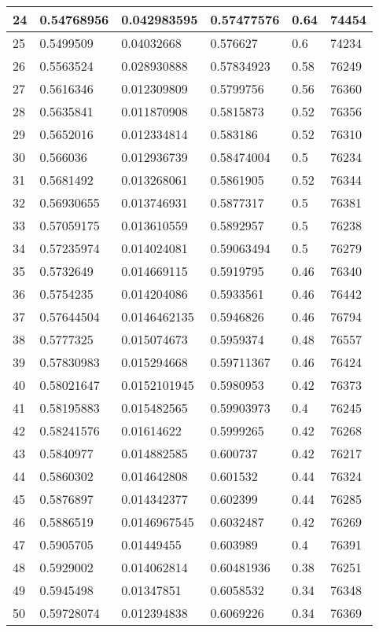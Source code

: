 \begin{longtable}{|l|l|l|l|l|l|}
24 & 0.54768956 & 0.042983595 & 0.57477576 & 0.64 & 74454 \\ \hline 
25 & 0.5499509 & 0.04032668 & 0.576627 & 0.6 & 74234 \\ \hline 
26 & 0.5563524 & 0.028930888 & 0.57834923 & 0.58 & 76249 \\ \hline 
27 & 0.5616346 & 0.012309809 & 0.5799756 & 0.56 & 76360 \\ \hline 
28 & 0.5635841 & 0.011870908 & 0.5815873 & 0.52 & 76356 \\ \hline 
29 & 0.5652016 & 0.012334814 & 0.583186 & 0.52 & 76310 \\ \hline 
30 & 0.566036 & 0.012936739 & 0.58474004 & 0.5 & 76234 \\ \hline 
31 & 0.5681492 & 0.013268061 & 0.5861905 & 0.52 & 76344 \\ \hline 
32 & 0.56930655 & 0.013746931 & 0.5877317 & 0.5 & 76381 \\ \hline 
33 & 0.57059175 & 0.013610559 & 0.5892957 & 0.5 & 76238 \\ \hline 
34 & 0.57235974 & 0.014024081 & 0.59063494 & 0.5 & 76279 \\ \hline 
35 & 0.5732649 & 0.014669115 & 0.5919795 & 0.46 & 76340 \\ \hline 
36 & 0.5754235 & 0.014204086 & 0.5933561 & 0.46 & 76442 \\ \hline 
37 & 0.57644504 & 0.0146462135 & 0.5946826 & 0.46 & 76794 \\ \hline 
38 & 0.5777325 & 0.015074673 & 0.5959374 & 0.48 & 76557 \\ \hline 
39 & 0.57830983 & 0.015294668 & 0.59711367 & 0.46 & 76424 \\ \hline 
40 & 0.58021647 & 0.0152101945 & 0.5980953 & 0.42 & 76373 \\ \hline 
41 & 0.58195883 & 0.015482565 & 0.59903973 & 0.4 & 76245 \\ \hline 
42 & 0.58241576 & 0.01614622 & 0.5999265 & 0.42 & 76268 \\ \hline 
43 & 0.5840977 & 0.014882585 & 0.600737 & 0.42 & 76217 \\ \hline 
44 & 0.5860302 & 0.014642808 & 0.601532 & 0.44 & 76324 \\ \hline 
45 & 0.5876897 & 0.014342377 & 0.602399 & 0.44 & 76285 \\ \hline 
46 & 0.5886519 & 0.0146967545 & 0.6032487 & 0.42 & 76269 \\ \hline 
47 & 0.5905705 & 0.01449455 & 0.603989 & 0.4 & 76391 \\ \hline 
48 & 0.5929002 & 0.014062814 & 0.60481936 & 0.38 & 76251 \\ \hline 
49 & 0.5945498 & 0.01347851 & 0.6058532 & 0.34 & 76348 \\ \hline 
50 & 0.59728074 & 0.012394838 & 0.6069226 & 0.34 & 76369 \\ \hline 
\end{longtable}